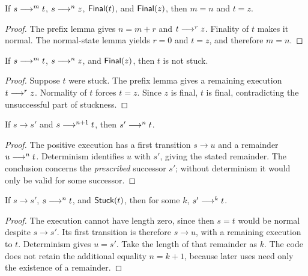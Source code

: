 \begin{lemma}
If $s\mathrel{\longrightarrow^{m}}t$, $s\mathrel{\longrightarrow^{n}}z$, $\mathsf{Final}(t)$, and $\mathsf{Final}(z)$, then
$m=n$ and $t=z$.
\end{lemma}
\begin{proof}
The prefix lemma gives $n=m+r$ and $t\mathrel{\longrightarrow^{r}}z$. Finality of $t$ makes
it normal. The normal-state lemma yields $r=0$ and $t=z$, and therefore
$m=n$.
\end{proof}

\begin{lemma}
If $s\mathrel{\longrightarrow^{m}}t$, $s\mathrel{\longrightarrow^{n}}z$, and $\mathsf{Final}(z)$, then $t$ is not stuck.
\end{lemma}
\begin{proof}
Suppose $t$ were stuck. The prefix lemma gives a remaining execution
$t\mathrel{\longrightarrow^{r}}z$. Normality of $t$ forces $t=z$. Since $z$ is final, $t$
is final, contradicting the unsuccessful part of stuckness.
\end{proof}

\begin{lemma}
If $s\to s'$ and $s\mathrel{\longrightarrow^{n+1}}t$, then $s'\mathrel{\longrightarrow^{n}}t$.
\end{lemma}
\begin{proof}
The positive execution has a first transition $s\to u$ and a remainder
$u\mathrel{\longrightarrow^{n}}t$. Determinism identifies $u$ with $s'$, giving the stated
remainder. The conclusion concerns the \emph{prescribed} successor $s'$;
without determinism it would only be valid for some successor.
\end{proof}

\begin{lemma}
If $s\to s'$, $s\mathrel{\longrightarrow^{n}}t$, and $\mathsf{Stuck}(t)$, then for some $k$,
$s'\mathrel{\longrightarrow^{k}}t$.
\end{lemma}
\begin{proof}
The execution cannot have length zero, since then $s=t$ would be normal
despite $s\to s'$. Its first transition is therefore $s\to u$, with a
remaining execution to $t$. Determinism gives $u=s'$. Take the length of
that remainder as $k$. The code does not retain the additional equality
$n=k+1$, because later uses need only the existence of a remainder.
\end{proof}
